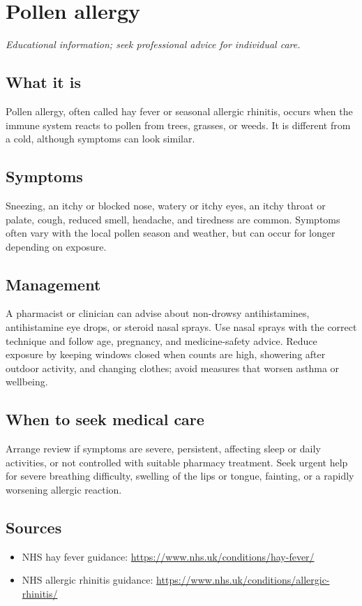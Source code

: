 \chapter{Pollen allergy}

\medskip
\noindent\textit{Educational information; seek professional advice for individual care.}

\section*{What it is}
Pollen allergy, often called hay fever or seasonal allergic rhinitis, occurs when the immune system reacts to pollen from trees, grasses, or weeds. It is different from a cold, although symptoms can look similar.

\section*{Symptoms}
Sneezing, an itchy or blocked nose, watery or itchy eyes, an itchy throat or palate, cough, reduced smell, headache, and tiredness are common. Symptoms often vary with the local pollen season and weather, but can occur for longer depending on exposure.

\section*{Management}
A pharmacist or clinician can advise about non-drowsy antihistamines, antihistamine eye drops, or steroid nasal sprays. Use nasal sprays with the correct technique and follow age, pregnancy, and medicine-safety advice. Reduce exposure by keeping windows closed when counts are high, showering after outdoor activity, and changing clothes; avoid measures that worsen asthma or wellbeing.

\section*{When to seek medical care}
Arrange review if symptoms are severe, persistent, affecting sleep or daily activities, or not controlled with suitable pharmacy treatment. Seek urgent help for severe breathing difficulty, swelling of the lips or tongue, fainting, or a rapidly worsening allergic reaction.

\section*{Sources}
\begin{itemize}
\item NHS hay fever guidance: \url{https://www.nhs.uk/conditions/hay-fever/}
\item NHS allergic rhinitis guidance: \url{https://www.nhs.uk/conditions/allergic-rhinitis/}
\end{itemize}
